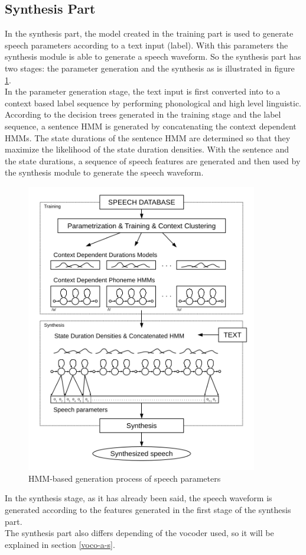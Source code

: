 \subsection{Synthesis Part}\label{synpart}
In the synthesis part, the model created in the training part is used to generate speech parameters according to a text input (label). With this parameters the synthesis module is able to generate a speech waveform. So the synthesis part has two stages: the parameter generation and the synthesis as is illustrated in figure \ref{syngen}.\\
In the parameter generation stage, the text input is first  converted into to a context based label sequence by performing  phonological and high level linguistic. According to the decision trees generated in the training stage and the label sequence, a sentence HMM is generated by concatenating the context dependent HMMs. The state durations of the sentence HMM are determined so that they maximize the likelihood of the state duration densities. With the sentence and the state durations, a sequence of speech features are generated and then used by the synthesis module to generate the speech waveform.\\
\begin{figure}[htb]
	\begin{center}
	\includegraphics[width=0.9\textwidth]{img/syngen.png}
	\end{center}
	\caption{\label{syngen}HMM-based generation process of speech parameters \cite{tuomo}}
\end{figure}
In the synthesis stage, as it has already been said, the speech waveform is generated according to the features generated in the first stage of the synthesis part.\\
The synthesis part also differs depending of the vocoder used, so it will be explained in section \ref{voco-a-s}.
\clearpage
